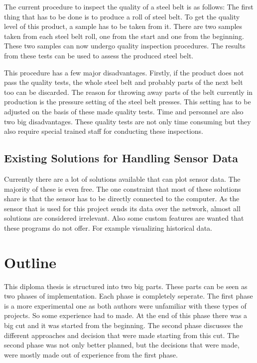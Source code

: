 The current procedure to inspect the quality of a steel belt is as follows: The first thing that has to be done is to produce a roll of steel belt. To get the quality level of this product, a sample has to be taken from it. There are two samples taken from each steel belt roll, one from the start and one from the beginning. These two samples can now undergo quality inspection procedures. The results from these tests can be used to assess the produced steel belt.

This procedure has a few major disadvantages. Firstly, if the product does not pass the quality tests, the whole steel belt and probably parts of the next belt too can be discarded. The reason for throwing away parts of the belt currently in production is the pressure setting of the steel belt presses. This setting has to be adjusted on the basis of these made quality tests. Time and personnel are also two big disadvantages. These quality tests are not only time consuming but they also require special trained staff for conducting these inspections.

\subsection{Existing Solutions for Handling Sensor Data}

Currently there are a lot of solutions available that can plot sensor data. The majority of these is even free. The one constraint that most of these solutions share is that the sensor has to be directly connected to the computer. As the sensor that is used for this project sends its data over the network, almost all solutions are considered irrelevant. Also some custom features are wanted that these programs do not offer. For example visualizing historical data.

\section{Outline}


This diploma thesis is structured into two big parts. These parts can be seen as two phases of implementation. Each phase is completely seperate. The first phase is a more experimental one as both authors were unfamiliar with these types of projects. So some experience had to made. At the end of this phase there was a big cut and it was started from the beginning. The second phase discusses the different approaches and decision that were made starting from this cut. The second phase was not only better planned, but the decisions that were made, were mostly made out of experience from the first phase.
